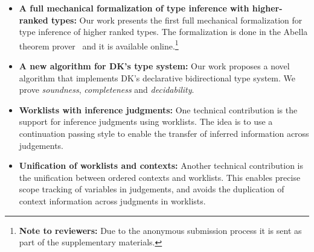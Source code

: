 \begin{itemize}

\item {\bf A full mechanical formalization of type inference with
  higher-ranked types:} Our work presents the first full mechanical formalization
  for type inference of higher ranked types. The formalization is done in the
  Abella theorem prover~\cite{AbellaDesc} and it is available
  online.\footnote{{\bf Note to reviewers:} Due to the anonymous submission process
  it is sent as part of the supplementary materials.}

\item {\bf A new algorithm for DK's type system:} Our work proposes a novel algorithm that implements
  DK's declarative bidirectional type system. We prove
  \emph{soundness}, \emph{completeness} and
  \emph{decidability}. 

\item {\bf Worklists with inference judgments:} One technical contribution is the
  support for inference judgments using worklists. The idea is to
  use a continuation passing style to enable the transfer of inferred information across
  judgements. 

\item {\bf Unification of worklists and contexts:} Another technical contribution is the unification
  between ordered contexts and worklists. This enables precise scope tracking
  of variables in judgements, and avoids the duplication of context information across
  judgments in worklists.

\begin{comment}
\jimmy{Notes @20190211 4 points of novalty:\\
1) Dealing with inference judgements and CPS-style chains\\
2) The form of the judgment itself with a single shared context\\
3) The way we deal with scope (which may follow from 2)\\
4) Immediate substitution (judgment list)
}
\end{comment}

\end{itemize}
